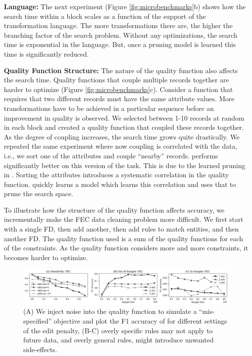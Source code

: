 \vspace{0.5em}\noindent \textbf{Language: } The next experiment (Figure \ref{fig:microbenchmarks}b) shows how the search time within a block scales as a function of the support of the transformation language. The more transformations there are, the higher the branching factor of the search problem. Without any optimizations, the search time is exponential in the language. But, once a pruning model is learned this time is significantly reduced.

\vspace{0.5em}\noindent \textbf{Quality Function Structure: } The nature of the quality function also affects the search time. Quality functions that couple multiple records together are harder to optimize (Figure \ref{fig:microbenchmarks}c).
Consider a function that requires that two different records must have the same attribute values.
More transformations have to be achieved in a particular sequence before an improvement in quality is observed. 
We selected between 1-10 records at random in each block and created a quality function that coupled these records together.
As the degree of coupling increases, the search time grows quite drastically.
We repeated the same experiment where now coupling is correlated with the data, i.e., we sort one of the attributes and couple ``nearby'' records.
\sys performs significantly better on this version of the task.
This is due to the learned pruning in \sys.
Sorting the attributes introduces a systematic correlation in the quality function.
\sys quickly learns a model which learns this correlation and uses that to prune the search space.

To illustrate how the structure of the quality function affects accuracy, we incrementally make the FEC data cleaning problem more difficult.
We first start with a single FD, then add another, then add rules to match entities, and then another FD.
The quality function used is a sum of the quality functions for each of the constraints.
As the quality function considers more and more constraints, it becomes harder to optimize.

 \begin{figure}[ht]
\centering
 \includegraphics[width=\textwidth]{exp/exp5.png}
 \caption{ (A) We inject noise into the quality function to simulate a ``mis-specified'' objective and plot the F1 accuracy of \sys for different settings of the edit penalty, (B-C) overly specific rules may not apply to future data, and overly general rules, might introduce unwanted side-effects.
 \label{fig:sensitivity}}
\end{figure}

